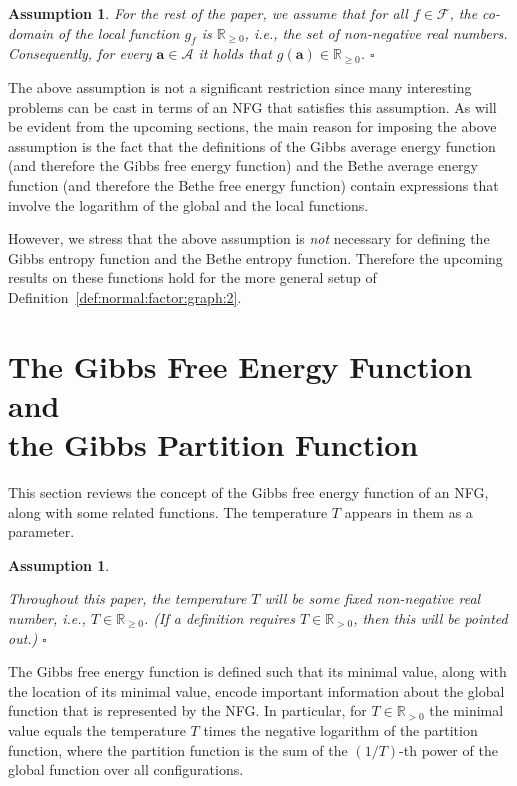 \documentclass[journal, twocolumn]{IEEEtran}
\renewcommand{\mathbf}[1]{{\bm{#1}}}
\newcommand{\ie}{\emph{i.e.}}
\renewcommand{\geq}{\geqslant}
\newcommand{\Rp}{\mathbb{R}_{\geq 0}}
\newcommand{\Rpp}{\mathbb{R}_{>0}}
\newcommand{\vect}[1]{\mathbf{#1}}
\newcommand{\set}[1]{\mathcal{#1}}
\newcommand{\setA}{\set{A}}
\newcommand{\setF}{\set{F}}
\newcommand{\va}{\vect{a}}
\newcommand{\?}{\mathrm{?}}
\newcommand{\qedwhite}{\hspace*{\fill}%
  $\square$\smallskip}
\newcommand{\assumptionend}{\qedwhite}
\newtheorem{Assumption}[Lemma]{Assumption}
\begin{document}
\begin{Assumption}
  For the rest of the paper, we assume that for all $f \in \setF$, the
  co-domain of the local function $g_f$ is $\Rp$, \ie, the set of non-negative
  real numbers. Consequently, for every $\va \in \setA$ it holds that $g(\va)
  \in \Rp$.  \assumptionend
\end{Assumption}


The above assumption is not a significant restriction since many interesting
problems can be cast in terms of an NFG that satisfies this assumption. As
will be evident from the upcoming sections, the main reason for imposing the
above assumption is the fact that the definitions of the Gibbs average energy
function (and therefore the Gibbs free energy function) and the Bethe average
energy function (and therefore the Bethe free energy function) contain
expressions that involve the logarithm of the global and the local functions.

However, we stress that the above assumption is \emph{not} necessary for
defining the Gibbs entropy function and the Bethe entropy function. Therefore
the upcoming results on these functions hold for the more general setup of
Definition~\ref{def:normal:factor:graph:2}.



\section{The Gibbs Free Energy Function and \\
                 the Gibbs Partition Function}
\label{sec:FGibbs:and:ZGibbs:1}


This section reviews the concept of the Gibbs free energy function of an NFG,
along with some related functions. The temperature $T$ appears in them as a
parameter.


\begin{Assumption}
  \label{assumption:temperature:1}

  Throughout this paper, the temperature $T$ will be some fixed non-negative
  real number, \ie, $T \in \Rp$. (If a definition requires $T \in \Rpp$, then
  this will be pointed out.) \assumptionend
\end{Assumption}


The Gibbs free energy function is defined such that its minimal value, along
with the location of its minimal value, encode important information about the
global function that is represented by the NFG. In particular,
for $T \in \Rpp$ the minimal value equals the temperature $T$ times the
negative logarithm of the partition function, where the partition function is
the sum of the $(1/T)$-th power of the global function over all
configurations.
\end{document}
